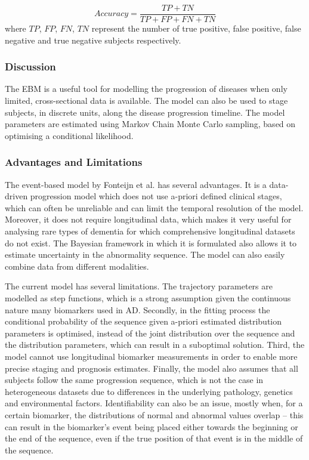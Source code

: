 \begin{equation}
 Accuracy = \frac{TP + TN}{TP + FP + FN + TN}
\end{equation}
where $TP$, $FP$, $FN$, $TN$ represent the number of true positive, false positive, false negative and true negative subjects respectively.

 
\subsubsection{Discussion}

The EBM is a useful tool for modelling the progression of diseases when only limited, cross-sectional data is available. The model can also be used to stage subjects, in discrete units, along the disease progression timeline. The model parameters are estimated using Markov Chain Monte Carlo sampling, based on optimising a conditional likelihood. 

\subsubsection{Advantages and Limitations}

The event-based model by Fonteijn et al. \cite{fonteijn2012event} has several advantages. It is a data-driven progression model which does not use a-priori defined clinical stages, which can often be unreliable and can limit the temporal resolution of the model. Moreover, it does not require longitudinal data, which makes it very useful for analysing rare types of dementia for which comprehensive longitudinal datasets do not exist. The Bayesian framework in which it is formulated also allows it to estimate uncertainty in the abnormality sequence. The model can also easily combine data from different modalities.  

The current model has several limitations. The trajectory parameters are modelled as step functions, which is a strong assumption given the continuous nature many biomarkers used in AD. Secondly, in the fitting process the conditional probability of the sequence given a-priori estimated distribution parameters is optimised, instead of the joint distribution over the sequence and the distribution parameters, which can result in a suboptimal solution. Third, the model cannot use longitudinal biomarker  measurements in order to enable more precise staging and prognosis estimates.  Finally, the model also assumes that all subjects follow the same progression sequence, which is not the case in heterogeneous datasets due to differences in the underlying pathology, genetics and environmental factors. Identifiability can also be an issue, mostly when, for a certain biomarker, the distributions of normal and abnormal values overlap -- this can result in the biomarker's event being placed either towards the beginning or the end of the sequence, even if the true position of that event is in the middle of the sequence.


